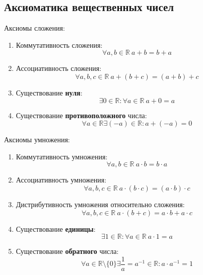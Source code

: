 \subsection{Аксиоматика вещественных чисел}
Аксиомы сложения:
\begin{enumerate}
	\item Коммутативность сложения:
	\begin{equation*}
	\forall a, b \in \mathbb R \ a + b = b + a
	\end{equation*}
	
	\item Ассоциативность сложения:
	\begin{equation*}
	\forall a, b, c \in \mathbb R \ a + (b + c) = (a + b) + c
	\end{equation*}
	
	\item Существование \textbf{нуля}:
	\begin{equation*}
	\exists 0 \in \mathbb R \colon \forall a \in \mathbb R \ a + 0 = a
	\end{equation*}
	
	\item Существование \textbf{противоположного} числа:
	\begin{equation*}
	\forall a \in \mathbb R \exists (-a) \in \mathbb R \colon a + (-a) = 0
	\end{equation*}
\end{enumerate}

Аксиомы умножения:
\begin{enumerate}
	\item Коммутативность умножения:
	\begin{equation*}
	\forall a, b \in \mathbb R \ a \cdot b = b \cdot a
	\end{equation*}
	
	\item Ассоциативность умножения:
	\begin{equation*}
	\forall a, b, c \in \mathbb R \ a \cdot (b \cdot c) = (a \cdot b) \cdot c
	\end{equation*}
	
	\item Дистрибутивность умножения относительно сложения:
	\begin{equation*}
	\forall a, b, c \in \mathbb R \ a \cdot (b + c) = a \cdot b + a \cdot c
	\end{equation*}
	
	\item Существование \textbf{единицы}:
	\begin{equation*}
	\exists 1 \in \mathbb R \colon \forall a \in \mathbb R \ a \cdot 1 = a
	\end{equation*}
	
	\item Существование \textbf{обратного} числа:
	\begin{equation*}
	\forall a \in \mathbb R \setminus \{ 0 \} \exists \frac1a = a^{-1} \in \mathbb R \colon
	a \cdot a^{-1} = 1
	\end{equation*}
\end{enumerate}


